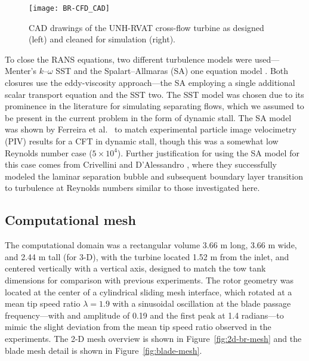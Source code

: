 \begin{figure}
    \centering

    \texttt{[image: BR-CFD\_CAD]}

    \caption{CAD drawings of the UNH-RVAT cross-flow turbine as designed (left)
        and cleaned for simulation (right).}

    \label{fig:cfd-cad}
\end{figure}

To close the RANS equations, two different turbulence models were
used---Menter's $k$--$\omega$ SST \cite{Menter1994} and the Spalart--Allmaras
(SA) one equation model \cite{Spalart1992}. Both closures use the eddy-viscosity
approach---the SA employing a single additional scalar transport equation and
the SST two. The SST model was chosen due to its prominence in the literature
for simulating separating flows, which we assumed to be present in the current
problem in the form of dynamic stall. The SA model was shown by Ferreira
et al.~\cite{Ferreira2007} to match experimental particle image
velocimetry (PIV) results for a CFT in dynamic stall, though this was a somewhat
low Reynolds number case ($5 \times 10^4$). Further justification for using the
SA model for this case comes from Crivellini and D'Alessandro
\cite{Crivellini2014}, where they successfully modeled the laminar separation
bubble and subsequent boundary layer transition to turbulence at Reynolds
numbers similar to those investigated here.



\subsection{Computational mesh}

The computational domain was a rectangular volume 3.66 m long, 3.66 m wide, and
2.44 m tall (for 3-D), with the turbine located 1.52 m from the inlet, and
centered vertically with a vertical axis, designed to match the tow tank
dimensions for comparison with previous experiments. The rotor geometry was
located at the center of a cylindrical sliding mesh interface, which rotated at
a mean tip speed ratio $\lambda=1.9$ with a sinusoidal oscillation at the blade
passage frequency---with and amplitude of 0.19 and the first peak at 1.4
radians---to mimic the slight deviation from the mean tip speed ratio observed
in the experiments. The 2-D mesh overview is shown in
Figure~\ref{fig:2d-br-mesh} and the blade mesh detail is shown in
Figure~\ref{fig:blade-mesh}.

